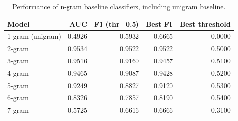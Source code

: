\begin{table}
\caption{Performance of n-gram baseline classifiers, including unigram baseline.}
\label{tab:ngram_baselines}
\begin{tabular}{lrrrr}
\toprule
Model & AUC & F1 (thr=0.5) & Best F1 & Best threshold \\
\midrule
1-gram (unigram) & 0.4926 & 0.5932 & 0.6665 & 0.0000 \\
2-gram & 0.9534 & 0.9522 & 0.9522 & 0.5000 \\
3-gram & 0.9516 & 0.9160 & 0.9457 & 0.5100 \\
4-gram & 0.9465 & 0.9087 & 0.9428 & 0.5200 \\
5-gram & 0.9249 & 0.8827 & 0.9120 & 0.5300 \\
6-gram & 0.8326 & 0.7857 & 0.8190 & 0.5400 \\
7-gram & 0.5725 & 0.6616 & 0.6666 & 0.3100 \\
\bottomrule
\end{tabular}
\end{table}
